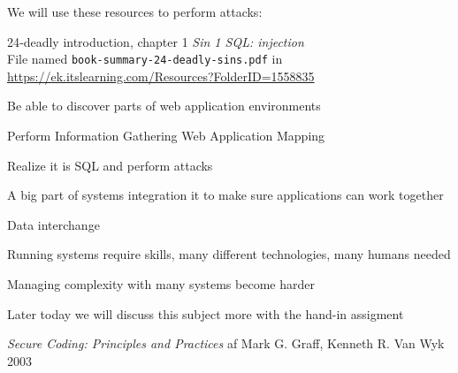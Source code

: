 \documentclass[Screen16to9,17pt]{foils}
\begin{document}

We will use these resources to perform attacks:
\begin{list2}
\item
24‑deadly introduction, chapter 1 \emph{Sin 1 SQL: injection}\\
File named \verb+book-summary-24-deadly-sins.pdf+ in \url{https://ek.itslearning.com/Resources?FolderID=1558835}
\end{list2}



\begin{list1}
\item Be able to discover parts of web application environments
\item Perform Information Gathering Web Application Mapping
\vskip 5mm
\item Realize it is SQL and perform attacks
\end{list1}












\begin{list2}
\item A big part of systems integration it to make sure applications can work together
\item Data interchange
\item Running systems require skills, many different technologies, many humans needed
\item Managing complexity with many systems become harder
\end{list2}

Later today we will discuss this subject more with the hand-in assigment



{\emph{Secure Coding: Principles and Practices} af Mark G. Graff, Kenneth R. Van Wyk 2003}
\end{document}
